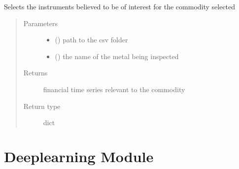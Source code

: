 \documentclass[letterpaper,10pt,english]{sphinxmanual}
\begin{document}
\begin{fulllineitems}
\label{\detokenize{index:Src.preprocessing.universe_select}}
Selects the instruments believed to be of
interest for the commodity selected
\begin{quote}\begin{description}
\item[{Parameters}] \leavevmode\begin{itemize}
\item {} 
 () \textendash{} path to the csv folder

\item {} 
 () \textendash{} the name of the metal being inspected

\end{itemize}

\item[{Returns}] \leavevmode
financial time series relevant to the commodity

\item[{Return type}] \leavevmode
dict

\end{description}\end{quote}

\end{fulllineitems}



\chapter{Deeplearning Module}
\label{\detokenize{index:module-Src.deeplearning}}\label{\detokenize{index:deeplearning-module}}
\end{document}
